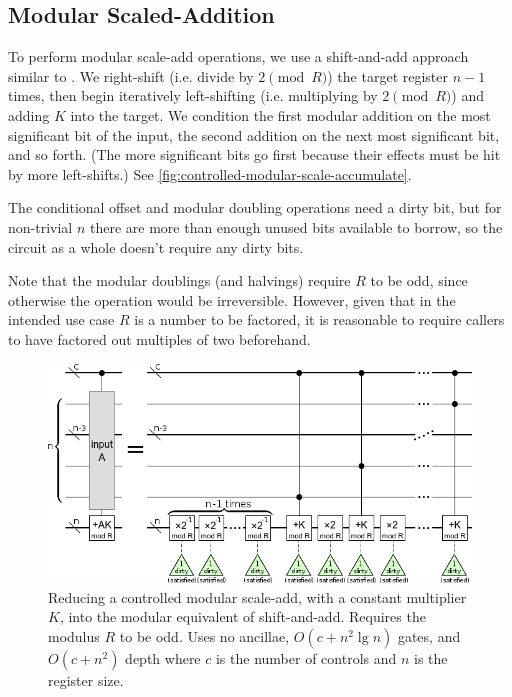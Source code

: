 \documentclass[twocolumn,longbibliography]{quantumarticle}
\begin{document}
\subsection{Modular Scaled-Addition}

To perform modular scale-add operations, we use a shift-and-add approach similar to \cite{beauregard2003}.
We right-shift (i.e. divide by $2 {\pmod R}$) the target register $n-1$ times, then begin iteratively left-shifting (i.e. multiplying by $2 {\pmod R}$) and adding $K$ into the target.
We condition the first modular addition on the most significant bit of the input, the second addition on the next most significant bit, and so forth.
(The more significant bits go first because their effects must be hit by more left-shifts.)
See \autoref{fig:controlled-modular-scale-accumulate}.

The conditional offset and modular doubling operations need a dirty bit, but for non-trivial $n$ there are more than enough unused bits available to borrow, so the circuit as a whole doesn't require any dirty bits.

Note that the modular doublings (and halvings) require $R$ to be odd, since otherwise the operation would be irreversible.
However, given that in the intended use case $R$ is a number to be factored, it is reasonable to require callers to have factored out multiples of two beforehand.

\begin{figure}
  \centering
  \includegraphics[width=\linewidth]{assets/controlled-modular-multiply-accumulate.png}
  \caption{
    Reducing a controlled modular scale-add, with a constant multiplier $K$, into the modular equivalent of shift-and-add.
    Requires the modulus $R$ to be odd.
    Uses no ancillae, $O(c + n^2 \lg n)$ gates, and $O(c + n^2)$ depth where $c$ is the number of controls and $n$ is the register size.
  }
  \label{fig:controlled-modular-scale-accumulate}
\end{figure}
\end{document}
